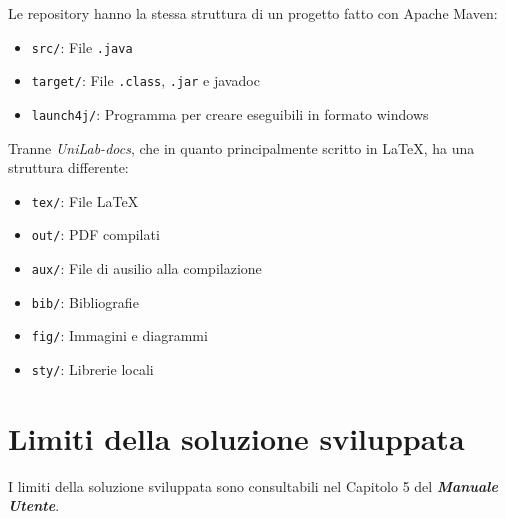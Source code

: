Le repository hanno la stessa struttura di un progetto fatto con Apache Maven:

\begin{itemize}
	\item \texttt{src/}: File \texttt{.java}
	\item \texttt{target/}: File \texttt{.class}, \texttt{.jar} e javadoc
	\item \texttt{launch4j/}: Programma per creare eseguibili in formato windows
\end{itemize}

Tranne \textsl{UniLab-docs}, che in quanto principalmente scritto in \LaTeX, ha una struttura differente:

\begin{itemize}
	\item \texttt{tex/}: File \LaTeX
	\item \texttt{out/}: PDF compilati
	\item \texttt{aux/}: File di ausilio alla compilazione
	\item \texttt{bib/}: Bibliografie
	\item \texttt{fig/}: Immagini e diagrammi
	\item \texttt{sty/}: Librerie locali
\end{itemize}


\chapter{Limiti della soluzione sviluppata}
I limiti della soluzione sviluppata sono consultabili nel Capitolo 5 del \textit{\textbf{Manuale Utente}}.

\nocite{IuriTex}


